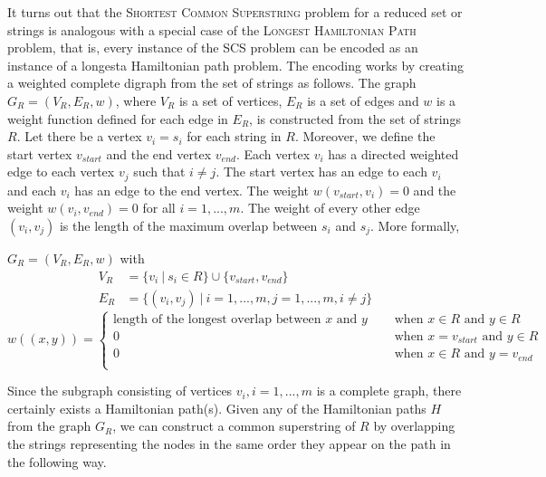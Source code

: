 \documentclass[english,twoside,censored,csm,algorithms-track-2020]{HYthesisML}
\theoremstyle{plain}
\theoremstyle{definition}
\begin{document}
It turns out that the \textsc{Shortest Common Superstring} problem for a reduced set or strings is
analogous with a special case of
the \textsc{Longest Hamiltonian Path} problem, that is, every instance of the SCS problem can be encoded
as an instance of a longesta Hamiltonian path problem. The encoding works by creating a weighted
complete digraph from the set of strings as follows. 
The graph $G_R=(V_R,E_R,w)$, where $V_R$ is a set of vertices, $E_R$ is a set of edges and $w$ is a
 weight function defined for each edge in $E_R$, is constructed from the set of strings $R$.
Let there be a vertex $v_i=s_i$ for each string in $R$. Moreover, we define the start vertex
$v_{start}$ and the end vertex $v_{end}$. Each vertex $v_i$ has a directed weighted edge to each vertex
$v_j$ such that $i\neq j$. The start vertex has an edge to each $v_i$ and each $v_i$ has an edge to the
end vertex. The weight $w(v_{start}, v_i) = 0$ and the weight $w(v_i, v_{end}) = 0$ for all $i=1,...,m$.
The weight of every other edge $(v_i, v_j)$ is the length of the maximum overlap between $s_i$ and $s_j$.
More formally,

$G_R=(V_R,E_R,w)$ with
\begin{align*}
  V_R &= \{v_i~|~s_i\in R\} \cup \{v_{start},v_{end}\} \\
  E_R &= \{(v_i,v_j)~|~i=1,...,m, j=1,...,m, i\neq j\}
\end{align*}
\[   
w((x,y)) = 
     \begin{cases}
       \text{length of the longest overlap between } x \text{ and } y &\quad\text{ when } x\in R \text{ and } y\in R  \\
       0 &\quad\text{ when } x=v_{start} \text{ and } y\in R \\
       0 &\quad\text{ when } x\in R \text{ and } y=v_{end} \\
     \end{cases}
     \]





Since the subgraph consisting of vertices $v_i, i=1,...,m$ is a complete graph, there certainly exists a
Hamiltonian path(s).\citep{asd} Given any
of the Hamiltonian paths $H$ from the graph $G_R$, we can construct a common superstring of $R$ by
overlapping the strings representing the nodes in the same order they appear on the path in the
following way.
\end{document}
